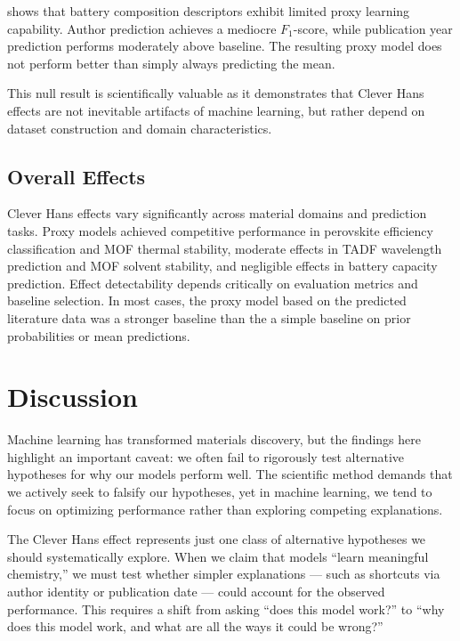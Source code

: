\documentclass[11pt, oneside]{article}
\begin{document}
 shows that battery composition descriptors exhibit limited proxy learning capability. Author prediction achieves a mediocre $F_1$-score, while publication year prediction performs moderately above baseline. The resulting proxy model does not perform better than simply always predicting the mean. 

This null result is scientifically valuable as it demonstrates that Clever Hans effects are not inevitable artifacts of machine learning, but rather depend on dataset construction and domain characteristics. 




\subsection{Overall Effects}

Clever Hans effects vary significantly across material domains and prediction tasks. Proxy models achieved competitive performance in perovskite efficiency classification and MOF thermal stability, moderate effects in TADF wavelength prediction and MOF solvent stability, and negligible effects in battery capacity prediction. Effect detectability depends critically on evaluation metrics and baseline selection. In most cases, the proxy model based on the predicted literature data was a stronger baseline than the a simple baseline on prior probabilities or mean predictions.


\section{Discussion}

Machine learning has transformed materials discovery,\autocite{Moosavi2020, Saal2020, Gubernatis2018} but the findings here highlight an important caveat: we often fail to rigorously test alternative hypotheses for why our models perform well. 
The scientific method demands that we actively seek to falsify our hypotheses,\autocite{Platt1964, popper2005logic, Chamberlin1965} yet in machine learning, we tend to focus on optimizing performance rather than exploring competing explanations.

The Clever Hans effect represents just one class of alternative hypotheses we should systematically explore. 
When we claim that models \enquote{learn meaningful chemistry,} we must test whether simpler explanations --- such as shortcuts via author identity or publication date --- could account for the observed performance.\autocite{Chuang2018} 
This requires a shift from asking \enquote{does this model work?} to \enquote{why does this model work, and what are all the ways it could be wrong?}
\end{document}
